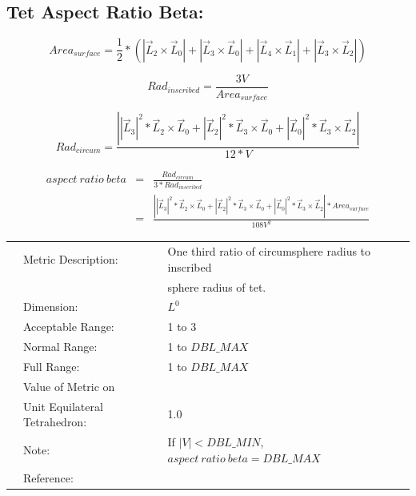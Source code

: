 \documentclass[12pt]{article}
\begin{document}
\subsection*{Tet Aspect Ratio Beta:}

\begin{displaymath}
Area_{surface} = \frac{1}{2} * \left(
                    |\vec L_2 \times \vec L_0| + 
                    |\vec L_3 \times \vec L_0| + 
                    |\vec L_4 \times \vec L_1| + 
                    |\vec L_3 \times \vec L_2|  \right)
\end{displaymath}

\begin{displaymath}
 Rad_{inscribed} = \frac { 3V } { Area_{surface} }
\end{displaymath}

\begin{displaymath}
 Rad_{circum} = \frac {\left| 
                              |\vec L_3|^2 * \vec L_2 \times \vec L_0 + 
                              |\vec L_2|^2 * \vec L_3 \times \vec L_0 + 
                              |\vec L_0|^2 * \vec L_3 \times \vec L_2 
                              \right|
                              }
                              {12 * V } 
\end{displaymath} 

\begin{eqnarray}
aspect~ratio~beta & = & \frac { Rad_{circum} } {3*Rad_{inscribed} } \nonumber 
\\
                  & = &\frac { \left| 
                             |\vec L_3|^2 * \vec L_2 \times \vec L_0 + 
                             |\vec L_2|^2 * \vec L_3 \times \vec L_0 + 
                             |\vec L_0|^2 * \vec L_3 \times \vec L_2 
                             \right| * Area_{surface} }
                            { 108V^2}
\end{eqnarray}

\begin{tabular}{lll}
& Metric Description:  & One third ratio of circumsphere radius to inscribed \\
&                      & sphere radius of tet. \\
& Dimension:           & $L^0$              \\ 
& Acceptable Range:    & 1 to 3 \\ 
& Normal Range:        & 1 to $DBL\_MAX$   \\ 
& Full Range:          & 1 to $DBL\_MAX$   \\ 
& Value of Metric on   &  \\
& Unit Equilateral Tetrahedron:    & 1.0 \\
& Note:                & If $|V| < DBL\_MIN$, $aspect~ratio~beta = DBL\_MAX$ \\
& Reference:           &  \cite{one} \\
\end{tabular} 
\end{document}
